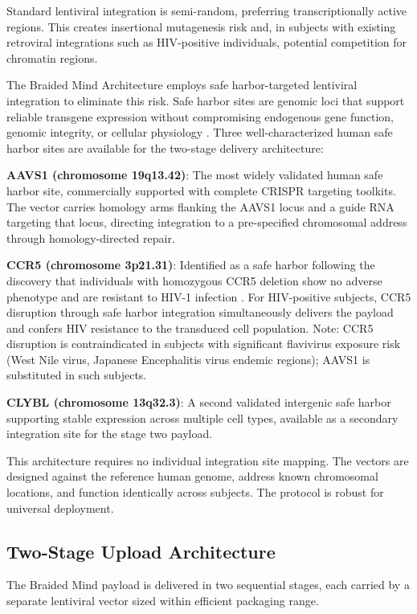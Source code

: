 \documentclass[12pt]{article}
\begin{document}
Standard lentiviral integration is semi-random, preferring transcriptionally active regions. This creates insertional mutagenesis risk and, in subjects with existing retroviral integrations such as HIV-positive individuals, potential competition for chromatin regions.

The Braided Mind Architecture employs safe harbor-targeted lentiviral integration to eliminate this risk. Safe harbor sites are genomic loci that support reliable transgene expression without compromising endogenous gene function, genomic integrity, or cellular physiology \cite{safeharbor_review_2026}. Three well-characterized human safe harbor sites are available for the two-stage delivery architecture:

\textbf{AAVS1 (chromosome 19q13.42)}: The most widely validated human safe harbor site, commercially supported with complete CRISPR targeting toolkits. The vector carries homology arms flanking the AAVS1 locus and a guide RNA targeting that locus, directing integration to a pre-specified chromosomal address through homology-directed repair.

\textbf{CCR5 (chromosome 3p21.31)}: Identified as a safe harbor following the discovery that individuals with homozygous CCR5 deletion show no adverse phenotype and are resistant to HIV-1 infection \cite{safeharbor_genes_2016}. For HIV-positive subjects, CCR5 disruption through safe harbor integration simultaneously delivers the payload and confers HIV resistance to the transduced cell population. Note: CCR5 disruption is contraindicated in subjects with significant flavivirus exposure risk (West Nile virus, Japanese Encephalitis virus endemic regions); AAVS1 is substituted in such subjects.

\textbf{CLYBL (chromosome 13q32.3)}: A second validated intergenic safe harbor supporting stable expression across multiple cell types, available as a secondary integration site for the stage two payload.

This architecture requires no individual integration site mapping. The vectors are designed against the reference human genome, address known chromosomal locations, and function identically across subjects. The protocol is robust for universal deployment.

\subsection{Two-Stage Upload Architecture}

The Braided Mind payload is delivered in two sequential stages, each carried by a separate lentiviral vector sized within efficient packaging range.
\end{document}
